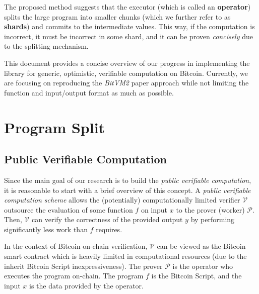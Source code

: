 \documentclass{iacrtrans}
\begin{document}
The proposed method suggests that the executor (which is called an
\textbf{operator}) splits the large program into smaller chunks (which we
further refer to as \textbf{shards}) and commits to the intermediate values.
This way, if the computation is incorrect, it must be incorrect in some shard,
and it can be proven \textit{concisely} due to the splitting mechanism.

This document provides a concise overview of our progress in implementing the
library for generic, optimistic, verifiable computation on Bitcoin. Currently,
we are focusing on reproducing the \textit{BitVM2} paper approach while not limiting the
function and input/output format as much as possible.

\section{Program Split}\label{sec:program-splitting}

\subsection{Public Verifiable Computation}

Since the main goal of our research is to build the \textit{public verifiable
computation}, it is reasonable to start with a brief overview of this concept. A
\textit{public verifiable computation scheme} allows the (potentially)
computationally limited verifier $\mathcal{V}$ outsource the evaluation of some
function $f$ on input $x$ to the prover (worker) $\mathcal{P}$. Then,
$\mathcal{V}$ can verify the correctness of the provided output $y$ by
performing significantly less work than $f$ requires. 

In the context of Bitcoin on-chain verification, $\mathcal{V}$ can be viewed as
the Bitcoin smart contract which is heavily limited in computational resources
(due to the inherit Bitcoin Script inexpressiveness). The prover $\mathcal{P}$
is the operator who executes the program on-chain. The program $f$ is the
Bitcoin Script, and the input $x$ is the data provided by the operator. 
\end{document}
